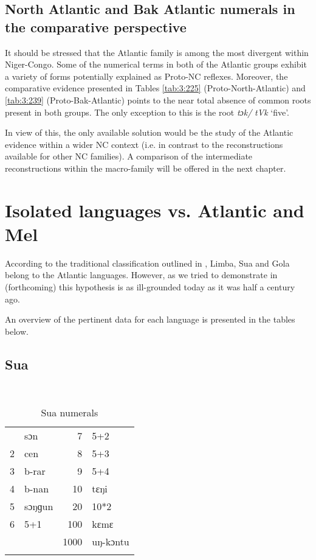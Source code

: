  
\subsection{North Atlantic and Bak Atlantic numerals in the comparative perspective}%
It should be stressed that the Atlantic family is among the most divergent within Niger-Congo. Some of the numerical terms in both of the Atlantic groups exhibit a variety of forms potentially explained as Proto-NC reflexes. Moreover, the comparative evidence presented in Tables \ref{tab:3:225} (Proto-North-Atlantic) and \ref{tab:3:239} (Proto-Bak-Atlantic) points to the near total absence of common roots present in both groups. The only exception to this is the root \textit{tɔk/} \textit{tVk} ‘five’.

In view of this, the only available solution would be the study of the Atlantic evidence within a wider NC context (i.e. in contrast to the reconstructions available for other NC families). A comparison of the intermediate reconstructions within the macro-family will be offered in the next chapter.

\section{Isolated languages vs. Atlantic and Mel}%

According to the traditional classification outlined in \citealt{Sapir1971}, Limba, Sua and Gola belong to the Atlantic languages. However, as we tried to demonstrate in \citealt{PozdniakovSegerer2017} (forthcoming) this hypothesis is as ill-grounded today as it was half a century ago. 

An overview of the pertinent data for each language is presented in the tables below.

\newpage 
\subsection{Sua}%
~\vspace*{-\baselineskip}
\begin{table}[h]
\caption{\label{tab:3:248}Sua numerals}
\begin{tabularx}{.66\textwidth}{lQrl}
 & sɔn & 7 & 5+2\\
2 & cen & 8 & 5+3\\
3 & b-rar & 9 & 5+4\\
4 & b-nan & 10 & tɛŋi\\
5 & sɔŋɡun & 20 & 10*2\\
6 & 5+1 & 100 & kɛmɛ\\
&  & 1000 & uŋ-kɔntu\\
\lspbottomrule
\end{tabularx}
\end{table}


